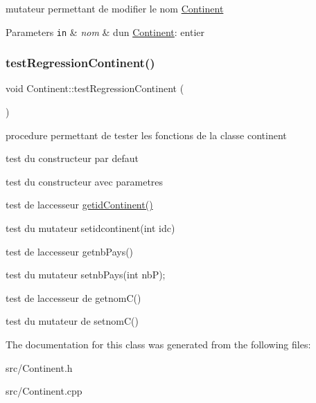 mutateur permettant de modifier le nom \mbox{\hyperlink{classContinent}{Continent}} 


\begin{DoxyParams}[1]{Parameters}
\mbox{\tt in}  & {\em nom} & d\textquotesingle{}un \mbox{\hyperlink{classContinent}{Continent}}\+: entier \\
\hline
\end{DoxyParams}
\mbox{\label{classContinent_acdfb73de042fa4ad3dae23452839e6ae}} 
\subsubsection{\texorpdfstring{test\+Regression\+Continent()}{testRegressionContinent()}}
{\footnotesize\ttfamily void Continent\+::test\+Regression\+Continent (\begin{DoxyParamCaption}{ }\end{DoxyParamCaption})}



procedure permettant de tester les fonctions de la classe continent 

test du constructeur par defaut

test du constructeur avec parametres

test de l\textquotesingle{}accesseur \mbox{\hyperlink{classContinent_ae3cfd254894dfd0f43f6804c257bf2f4}{getid\+Continent()}}

test du mutateur setidcontinent(int idc)

test de l\textquotesingle{}accesseur getnb\+Pays()

test du mutateur setnb\+Pays(int nb\+P);

test de l\textquotesingle{}accesseur de getnom\+C()

test du mutateur de setnom\+C() 

The documentation for this class was generated from the following files\+:\begin{DoxyCompactItemize}
\item 
src/Continent.\+h\item 
src/Continent.\+cpp\end{DoxyCompactItemize}
